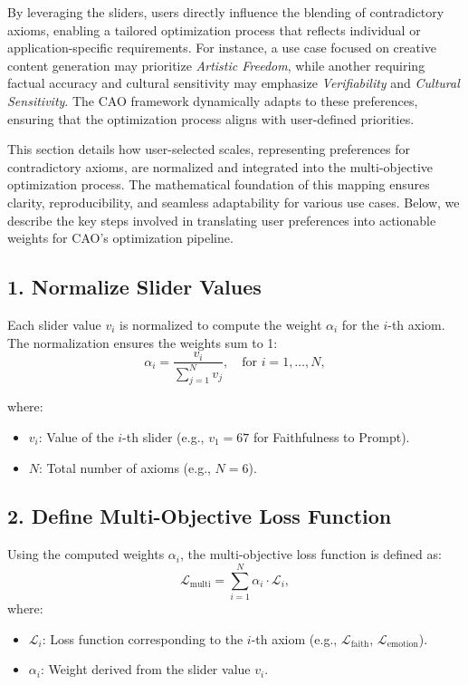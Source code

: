 By leveraging the sliders, users directly influence the blending of contradictory axioms, enabling a tailored optimization process that reflects individual or application-specific requirements. For instance, a use case focused on creative content generation may prioritize \emph{Artistic Freedom}, while another requiring factual accuracy and cultural sensitivity may emphasize \emph{Verifiability} and \emph{Cultural Sensitivity}. The CAO framework dynamically adapts to these preferences, ensuring that the optimization process aligns with user-defined priorities.

This section details how user-selected scales, representing preferences for contradictory axioms, are normalized and integrated into the multi-objective optimization process. The mathematical foundation of this mapping ensures clarity, reproducibility, and seamless adaptability for various use cases. Below, we describe the key steps involved in translating user preferences into actionable weights for CAO's optimization pipeline.


\subsection*{1. Normalize Slider Values}
Each slider value \(v_i\) is normalized to compute the weight \(\alpha_i\) for the \(i\)-th axiom. The normalization ensures the weights sum to 1:
\[
\alpha_i = \frac{v_i}{\sum_{j=1}^N v_j}, \quad \text{for } i = 1, \dots, N,
\]

\vspace{-3mm}
where:
\begin{itemize}[leftmargin=10pt, itemsep=0pt, topsep=3pt]
    \item \(v_i\): Value of the \(i\)-th slider (e.g., \(v_1 = 67\) for Faithfulness to Prompt).
    \item \(N\): Total number of axioms (e.g., \(N = 6\)).
\end{itemize}

\clearpage

\subsection*{2. Define Multi-Objective Loss Function}
Using the computed weights \(\alpha_i\), the multi-objective loss function is defined as:
\[
\mathcal{L}_{\text{multi}} = \sum_{i=1}^N \alpha_i \cdot \mathcal{L}_i,
\]
where:
\begin{itemize}[leftmargin=10pt, itemsep=0pt, topsep=3pt]
    \item \(\mathcal{L}_i\): Loss function corresponding to the \(i\)-th axiom (e.g., \(\mathcal{L}_{\text{faith}}\), \(\mathcal{L}_{\text{emotion}}\)).
    \item \(\alpha_i\): Weight derived from the slider value \(v_i\).
\end{itemize}

